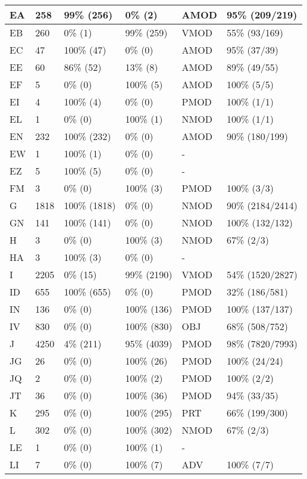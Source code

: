\begin{figure*}
\begin{tabular}{|l|l|l|l||l|l|}
\hline
 EA & 258 & 99\% (256) & 0\% (2) & AMOD & 95\% (209/219) \\ 
\hline
 EB & 260 & 0\% (1) & 99\% (259) & VMOD & 55\% (93/169) \\ 
\hline
 EC & 47 & 100\% (47) & 0\% (0) & AMOD & 95\% (37/39) \\ 
\hline
 EE & 60 & 86\% (52) & 13\% (8) & AMOD & 89\% (49/55) \\ 
\hline
 EF & 5 & 0\% (0) & 100\% (5) & AMOD & 100\% (5/5) \\ 
\hline
 EI & 4 & 100\% (4) & 0\% (0) & PMOD & 100\% (1/1) \\ 
\hline
 EL & 1 & 0\% (0) & 100\% (1) & NMOD & 100\% (1/1) \\ 
\hline
 EN & 232 & 100\% (232) & 0\% (0) & AMOD & 90\% (180/199) \\ 
\hline
 EW & 1 & 100\% (1) & 0\% (0) & - &  \\ 
\hline
 EZ & 5 & 100\% (5) & 0\% (0) & - &  \\ 
\hline
 FM & 3 & 0\% (0) & 100\% (3) & PMOD & 100\% (3/3) \\ 
\hline
 G & 1818 & 100\% (1818) & 0\% (0) & NMOD & 90\% (2184/2414) \\ 
\hline
 GN & 141 & 100\% (141) & 0\% (0) & NMOD & 100\% (132/132) \\ 
\hline
 H & 3 & 0\% (0) & 100\% (3) & NMOD & 67\% (2/3) \\ 
\hline
 HA & 3 & 100\% (3) & 0\% (0) & - &  \\ 
\hline
 I & 2205 & 0\% (15) & 99\% (2190) & VMOD & 54\% (1520/2827) \\ 
\hline
 ID & 655 & 100\% (655) & 0\% (0) & PMOD & 32\% (186/581) \\ 
\hline
 IN & 136 & 0\% (0) & 100\% (136) & PMOD & 100\% (137/137) \\ 
\hline
 IV & 830 & 0\% (0) & 100\% (830) & OBJ & 68\% (508/752) \\ 
\hline
 J & 4250 & 4\% (211) & 95\% (4039) & PMOD & 98\% (7820/7993) \\ 
\hline
 JG & 26 & 0\% (0) & 100\% (26) & PMOD & 100\% (24/24) \\ 
\hline
 JQ & 2 & 0\% (0) & 100\% (2) & PMOD & 100\% (2/2) \\ 
\hline
 JT & 36 & 0\% (0) & 100\% (36) & PMOD & 94\% (33/35) \\ 
\hline
 K & 295 & 0\% (0) & 100\% (295) & PRT & 66\% (199/300) \\ 
\hline
 L & 302 & 0\% (0) & 100\% (302) & NMOD & 67\% (2/3) \\ 
\hline
 LE & 1 & 0\% (0) & 100\% (1) & - &  \\ 
\hline
 LI & 7 & 0\% (0) & 100\% (7) & ADV & 100\% (7/7) \\ 
\hline
\end{tabular}
\end{figure*}
